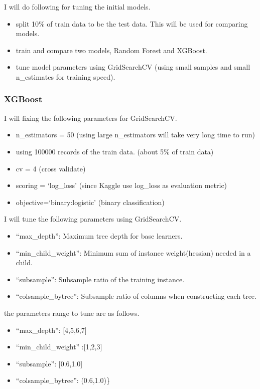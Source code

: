 \documentclass[11pt]{article}
\begin{document}
I will do following for tuning the initial models.

\begin{itemize}
\itemsep1pt\parskip0pt
\item
  split 10\% of train data to be the test data. This will be used for
  comparing models.
\item
  train and compare two models, Random Forest and XGBoost.
\item
  tune model parameters using GridSearchCV (using small samples and
  small n\_estimates for training speed).
\end{itemize}

\subsubsection{XGBoost}\label{xgboost}

I will fixing the following parameters for GridSearchCV.

\begin{itemize}
\itemsep1pt\parskip0pt
\item
  n\_estimators = 50 (using large n\_estimators will take very long time
  to run)
\item
  using 100000 records of the train data. (about 5\% of train data)
\item
  cv = 4 (cross validate)
\item
  scoring = `log\_loss' (since Kaggle use log\_loss as evaluation
  metric)
\item
  objective=`binary:logistic' (binary classification)
\end{itemize}

I will tune the following parameters using GridSearchCV.

\begin{itemize}
\itemsep1pt\parskip0pt
\item
  ``max\_depth'': Maximum tree depth for base learners.
\item
  ``min\_child\_weight'': Minimum sum of instance weight(hessian) needed
  in a child.
\item
  ``subsample'': Subsample ratio of the training instance.
\item
  ``colsample\_bytree'': Subsample ratio of columns when constructing
  each tree.
\end{itemize}

the parameters range to tune are as follows.

\begin{itemize}
\itemsep1pt\parskip0pt
\item
  ``max\_depth'': {[}4,5,6,7{]}
\item
  ``min\_child\_weight'' :{[}1,2,3{]}
\item
  ``subsample'': {[}0.6,1.0{]}
\item
  ``colsample\_bytree'': (0.6,1.0)\}
\end{itemize}
\end{document}
